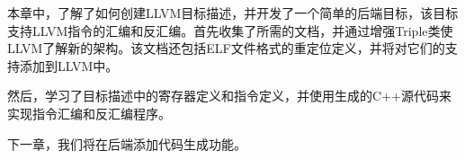 本章中，了解了如何创建LLVM目标描述，并开发了一个简单的后端目标，该目标支持LLVM指令的汇编和反汇编。首先收集了所需的文档，并通过增强Triple类使LLVM了解新的架构。该文档还包括ELF文件格式的重定位定义，并将对它们的支持添加到LLVM中。

然后，学习了目标描述中的寄存器定义和指令定义，并使用生成的C++源代码来实现指令汇编和反汇编程序。

下一章，我们将在后端添加代码生成功能。